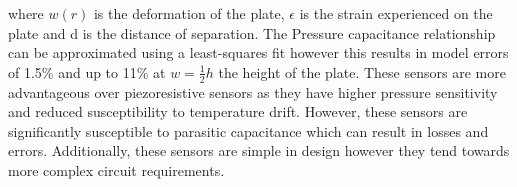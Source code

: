 where $w(r)$ is the deformation of the plate, $\epsilon$ is the strain experienced on the plate and d is the distance of separation. The Pressure capacitance relationship can be approximated using a least-squares fit \cite{eaton1997micromachined} however this results in model errors of 1.5\% and up to 11\% at $w = \frac{1}{2}h$ the height of the plate. These sensors are more advantageous over piezoresistive sensors as they have higher pressure sensitivity and reduced susceptibility to temperature drift. However, these sensors are significantly susceptible to parasitic capacitance which can result in losses and errors. Additionally, these sensors are simple in design however they tend towards more complex circuit requirements.


